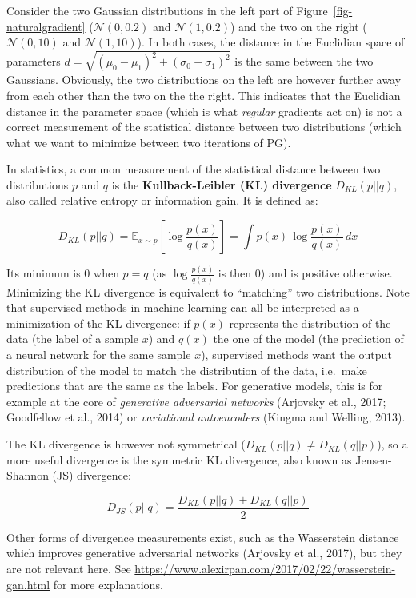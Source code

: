 \documentclass[
  letterpaper,
  DIV=11,
  numbers=noendperiod]{scrreprt}
\begin{document}
Consider the two Gaussian distributions in the left part of
Figure~\ref{fig-naturalgradient} (\(\mathcal{N}(0, 0.2)\) and
\(\mathcal{N}(1, 0.2)\)) and the two on the right
(\(\mathcal{N}(0, 10)\) and \(\mathcal{N}(1, 10)\)). In both cases, the
distance in the Euclidian space of parameters
\(d = \sqrt{(\mu_0 - \mu_1)^2+(\sigma_0 - \sigma_1)^2}\) is the same
between the two Gaussians. Obviously, the two distributions on the left
are however further away from each other than the two on the the right.
This indicates that the Euclidian distance in the parameter space (which
is what \emph{regular} gradients act on) is not a correct measurement of
the statistical distance between two distributions (which what we want
to minimize between two iterations of PG).

In statistics, a common measurement of the statistical distance between
two distributions \(p\) and \(q\) is the \textbf{Kullback-Leibler (KL)
divergence} \(D_{KL}(p||q)\), also called relative entropy or
information gain. It is defined as:

\[
    D_{KL}(p || q) = \mathbb{E}_{x \sim p} [\log \frac{p(x)}{q(x)}]  = \int p(x) \, \log \frac{p(x)}{q(x)} \, dx
\]

Its minimum is 0 when \(p=q\) (as \(\log \frac{p(x)}{q(x)}\) is then 0)
and is positive otherwise. Minimizing the KL divergence is equivalent to
``matching'' two distributions. Note that supervised methods in machine
learning can all be interpreted as a minimization of the KL divergence:
if \(p(x)\) represents the distribution of the data (the label of a
sample \(x\)) and \(q(x)\) the one of the model (the prediction of a
neural network for the same sample \(x\)), supervised methods want the
output distribution of the model to match the distribution of the data,
i.e.~make predictions that are the same as the labels. For generative
models, this is for example at the core of \emph{generative adversarial
networks} (Arjovsky et al., 2017; Goodfellow et al., 2014) or
\emph{variational autoencoders} (Kingma and Welling, 2013).

The KL divergence is however not symmetrical
(\(D_{KL}(p || q) \neq D_{KL}(q || p)\)), so a more useful divergence is
the symmetric KL divergence, also known as Jensen-Shannon (JS)
divergence:

\[
    D_{JS}(p || q) = \frac{D_{KL}(p || q) + D_{KL}(q || p)}{2}
\]

Other forms of divergence measurements exist, such as the Wasserstein
distance which improves generative adversarial networks (Arjovsky et
al., 2017), but they are not relevant here. See
\url{https://www.alexirpan.com/2017/02/22/wasserstein-gan.html} for more
explanations.
\end{document}
